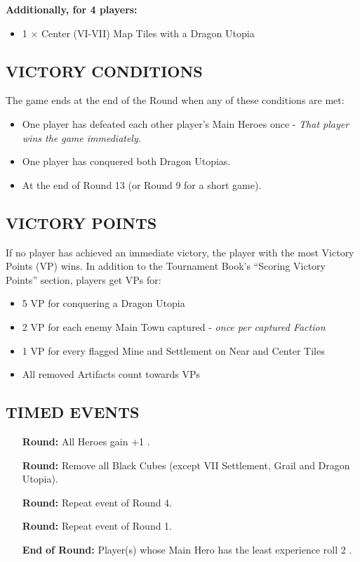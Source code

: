 \begin{multicols*}{2}
\textbf{Additionally, for 4 players:}
\begin{itemize}
  \item 1 × Center (VI-VII) Map Tiles with a Dragon Utopia
\end{itemize}

\subsection*{\MakeUppercase{Victory Conditions}}
The game ends at the end of the Round when any of these conditions are met:

\begin{itemize}
 \item One player has defeated each other player's Main Heroes once - \textit{That player wins the game immediately.}
 \item One player has conquered both Dragon Utopias.
 \item At the end of Round 13 (or Round 9 for a short game).
\end{itemize}

\subsection*{\MakeUppercase{Victory Points}}
If no player has achieved an immediate victory, the player with the most Victory Points (VP) wins.
In addition to the Tournament Book's ``Scoring Victory Points'' section, players get VPs for:

\begin{itemize}
 \item 5 VP for conquering a Dragon Utopia
 \item 2 VP for each enemy Main Town captured - \textit{once per captured Faction}
 \item 1 VP for every flagged Mine and Settlement on Near and Center Tiles
 \item All removed Artifacts count towards VPs
\end{itemize}

\subsection*{\MakeUppercase{Timed Events}}

\begin{itemize}
  \item[\textbf{\nth{1}}] \textbf{Round:} All Heroes gain +1 .
  \item[\textbf{\nth{4}}] \textbf{Round:} Remove all Black Cubes (except VII Settlement, Grail and Dragon Utopia).
  \item[\textbf{\nth{8}}] \textbf{Round:} Repeat event of Round 4.
  \item[\textbf{\nth{9}}] \textbf{Round:} Repeat event of Round 1.
  \item[\textbf{End}] \textbf{of  Round:} Player(s) whose Main Hero has the least experience roll 2 .
\end{itemize}


\end{multicols*}
